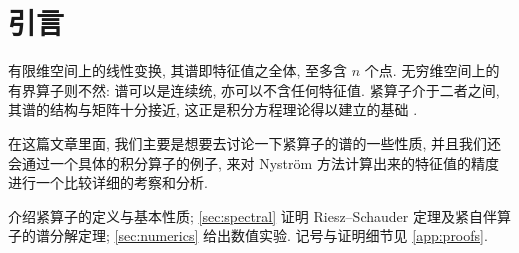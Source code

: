 \section{引言}\label{sec:intro}

有限维空间上的线性变换, 其谱即特征值之全体, 至多含 $n$ 个点. 无穷维空间上的有界算子则不然: 谱可以是连续统, 亦可以不含任何特征值. 紧算子介于二者之间, 其谱的结构与矩阵十分接近, 这正是积分方程理论得以建立的基础 \cite{riesz1918,fredholm1903}.

在这篇文章里面, 我们主要是想要去讨论一下紧算子的谱的一些性质, 并且我们还会通过一个具体的积分算子的例子, 来对 Nyström 方法计算出来的特征值的精度进行一个比较详细的考察和分析.

 介绍紧算子的定义与基本性质; \cref{sec:spectral} 证明 Riesz--Schauder 定理及紧自伴算子的谱分解定理; \cref{sec:numerics} 给出数值实验. 记号与证明细节见 \cref{app:proofs}.
